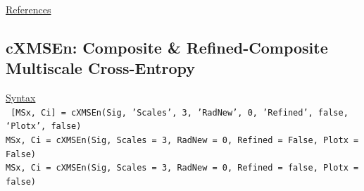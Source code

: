 \documentclass[12pt, a4paper, titlepage, openany]{book}
\begin{document}
\noindent \ul{References}\hspace{1cm}
\cite{MS1} \cite{MS2} \cite{MS3} \cite{XMS1} \cite{XMS2} \cite{XMS3} \cite{XMS4} 



\newpage
\subsection{\normalsize cXMSEn: \hspace{15mm} Composite \& Refined-Composite Multiscale Cross-Entropy}
\noindent\ul{Syntax} \vspace{6mm} \\ \noindent \texttt{\footnotesize
[MSx, Ci] = cXMSEn(Sig, 'Scales', 3, 'RadNew', 0, 'Refined', false, ‘Plotx’, false)\\
MSx, Ci = cXMSEn(Sig, Scales = 3, RadNew = 0, Refined = False, Plotx = False)\\ 
MSx, Ci = cXMSEn(Sig, Scales = 3, RadNew = 0, Refined = false, Plotx = false)}
\end{document}
